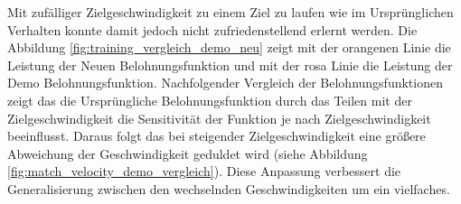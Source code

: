 Mit zufälliger Zielgeschwindigkeit zu einem Ziel zu laufen wie im Ursprünglichen Verhalten konnte damit jedoch nicht zufriedenstellend erlernt werden. Die Abbildung \ref{fig:training_vergleich_demo_neu} zeigt mit der orangenen Linie die Leistung der Neuen Belohnungsfunktion und mit der rosa Linie die Leistung der Demo Belohnungsfunktion. Nachfolgender Vergleich der Belohnungsfunktionen zeigt das die Ursprüngliche Belohnungsfunktion durch das Teilen mit der Zielgeschwindigkeit die Sensitivität der Funktion je nach Zielgeschwindigkeit beeinflusst. Daraus folgt das bei steigender Zielgeschwindigkeit eine größere Abweichung der Geschwindigkeit geduldet wird (siehe Abbildung \ref{fig:match_velocity_demo_vergleich}). Diese Anpassung verbessert die Generalisierung zwischen den wechselnden Geschwindigkeiten um ein vielfaches.

